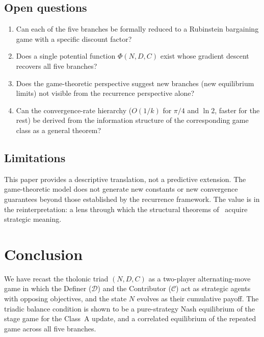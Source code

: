 \documentclass[12pt]{article}
\theoremstyle{definition}
\theoremstyle{remark}
\begin{document}
\subsection*{Open questions}

\begin{enumerate}
\item Can each of the five branches be formally reduced to a Rubinstein bargaining game
      with a specific discount factor?
\item Does a single potential function $\Phi(N, D, C)$ exist whose gradient descent
      recovers all five branches?
\item Does the game-theoretic perspective suggest new branches (new equilibrium limits)
      not visible from the recurrence perspective alone?
\item Can the convergence-rate hierarchy ($O(1/k)$ for $\pi/4$ and $\ln 2$, faster for
      the rest) be derived from the information structure of the corresponding game class
      as a general theorem?
\end{enumerate}

\subsection*{Limitations}

This paper provides a descriptive translation, not a predictive extension.  The
game-theoretic model does not generate new constants or new convergence guarantees beyond
those established by the recurrence framework.  The value is in the reinterpretation: a
lens through which the structural theorems of~\cite{Mil26a} acquire strategic meaning.

\section{Conclusion}
\label{sec:conclusion}

We have recast the tholonic triad $(N, D, C)$ as a two-player alternating-move game in
which the Definer ($\mathcal{D}$) and the Contributor ($\mathcal{C}$) act as strategic
agents with opposing objectives, and the state $N$ evolves as their cumulative payoff.
The triadic balance condition is shown to be a pure-strategy Nash equilibrium of the
stage game for the Class~A update, and a correlated equilibrium of the repeated game
across all five branches.
\end{document}
